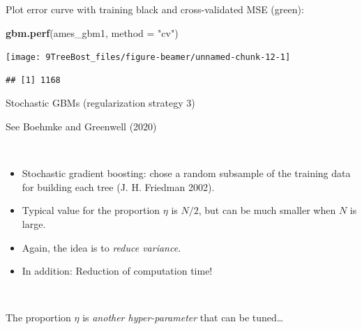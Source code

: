 \documentclass[
  10pt,
  ignorenonframetext,
]{beamer}
\newenvironment{Shaded}{\begin{snugshade}}{\end{snugshade}}
\newcommand{\AttributeTok}[1]{\textcolor[rgb]{0.13,0.29,0.53}{#1}}
\newcommand{\FunctionTok}[1]{\textcolor[rgb]{0.13,0.29,0.53}{\textbf{#1}}}
\newcommand{\NormalTok}[1]{#1}
\newcommand{\StringTok}[1]{\textcolor[rgb]{0.31,0.60,0.02}{#1}}
\providecommand{\tightlist}{%
  \setlength{\itemsep}{0pt}\setlength{\parskip}{0pt}}
\begin{document}
\begin{frame}[fragile]
Plot error curve with training black and cross-validated MSE (green):

\vspace{2mm}

\scriptsize

\begin{Shaded}
\begin{Highlighting}[]
\FunctionTok{gbm.perf}\NormalTok{(ames\_gbm1, }\AttributeTok{method =} \StringTok{"cv"}\NormalTok{)}
\end{Highlighting}
\end{Shaded}

\begin{center}\texttt{[image: 9TreeBost\_files/figure-beamer/unnamed-chunk-12-1]} \end{center}

\begin{verbatim}
## [1] 1168
\end{verbatim}
\end{frame}

\begin{frame}
\begin{block}{Stochastic GBMs (regularization strategy 3)}
\protect\hypertarget{stochastic-gbms-regularization-strategy-3}{}
\scriptsize

See Boehmke and Greenwell (2020)

\(~\) \normalsize

\begin{itemize}
\tightlist
\item
  Stochastic gradient boosting: chose a random subsample of the training
  data for building each tree (J. H. Friedman 2002).
\end{itemize}

\vspace{2mm}

\begin{itemize}
\tightlist
\item
  Typical value for the proportion \(\eta\) is \(N/2\), but can be much
  smaller when \(N\) is large.
\end{itemize}

\vspace{2mm}

\begin{itemize}
\tightlist
\item
  Again, the idea is to \emph{reduce variance}.
\end{itemize}

\vspace{2mm}

\begin{itemize}
\tightlist
\item
  In addition: Reduction of computation time!
\end{itemize}

\(~\)

The proportion \(\eta\) is \emph{another hyper-parameter} that can be
tuned\ldots{}
\end{block}
\end{frame}
\end{document}
